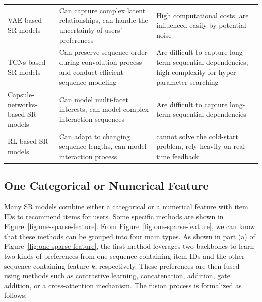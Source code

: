 \documentclass[review]{fcs}
\begin{document}
\begin{table}[h]
\begin{tabular}{p{4cm}p{6cm}p{6cm}}
			VAE-based SR models & Can capture complex latent relationships, can handle the uncertainty of users' preferences & High computational costs, are influenced easily by potential noise\\
			TCNs-based SR models & Can preserve sequence order during convolution process and conduct efficient sequence modeling & Are difficult to capture long-term sequential dependencies, high complexity for hyper-parameter searching\\
			Capsule-networks-based SR models & Can model multi-facet interests, can model complex interaction sequences & Are difficult to capture long-term sequential dependencies\\
			RL-based SR models & Can adapt to changing sequence lengths, can model interaction process & cannot solve the cold-start problem, rely heavily on real-time feedback\\
			\hline
		\end{tabular}
	\end{table}
	\subsection{One Categorical or Numerical Feature}
	Many SR models combine either a categorical or a numerical feature with item IDs to recommend items for users. Some specific methods are shown in Figure~\ref{fig:one-sparse-feature}. From Figure~\ref{fig:one-sparse-feature}, we can know that these methods can be grouped into four main types. As shown in part (a) of Figure~\ref{fig:one-sparse-feature}, the first method leverages two backbones to learn two kinds of preferences from one sequence containing item IDs and the other sequence containing feature $k$, respectively. These preferences are then fused using methods such as contrastive learning, concatenation, addition, gate addition, or a cross-attention mechanism. The fusion process is formalized as follows:
	
\end{document}
